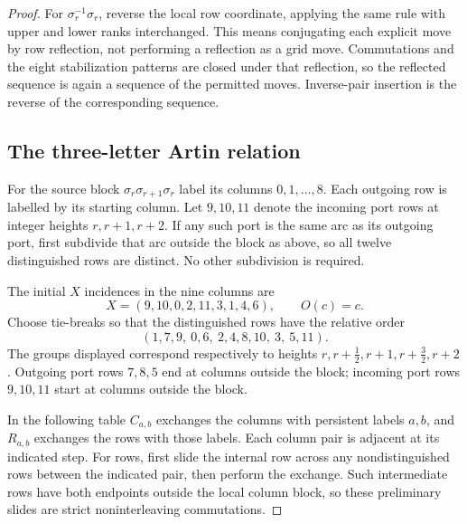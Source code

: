 \documentclass[11pt,a4paper]{article}
\theoremstyle{remark}
\begin{document}
\begin{proof}
For $\sigma_r^{-1}\sigma_r$, reverse the local row coordinate, applying
the same rule with upper and lower ranks interchanged.  This means
conjugating each explicit move by row reflection, not performing a
reflection as a grid move.  Commutations and the eight stabilization
patterns are closed under that reflection, so the reflected sequence is
again a sequence of the permitted moves.  Inverse-pair insertion is the
reverse of the corresponding sequence.

\subsection{The three-letter Artin relation}

For the source block $\sigma_r\sigma_{r+1}\sigma_r$ label its columns
$0,1,\ldots,8$.  Each outgoing row is labelled by its starting column.
Let $9,10,11$ denote the incoming port rows at integer heights
$r,r+1,r+2$.  If any such port is the same arc as its outgoing port,
first subdivide that arc outside the block as above, so all twelve
distinguished rows are distinct.  No other subdivision is required.

The initial $X$ incidences in the nine columns are
\[
 X=(9,10,0,2,11,3,1,4,6),\qquad O(c)=c.
\]
Choose tie-breaks so that the distinguished rows have the relative order
\[
 (1,7,9,\ 0,6,\ 2,4,8,10,\ 3,\ 5,11).
\]
The groups displayed correspond respectively to heights
$r,r+\tfrac12,r+1,r+\tfrac32,r+2$.  Outgoing port rows $7,8,5$ end at
columns outside the block; incoming port rows $9,10,11$ start at
columns outside the block.

In the following table $C_{a,b}$ exchanges the columns with persistent
labels $a,b$, and $R_{a,b}$ exchanges the rows with those labels.  Each
column pair is adjacent at its indicated step.  For rows, first slide
the internal row across any nondistinguished rows between the indicated
pair, then perform the exchange.  Such intermediate rows have both
endpoints outside the local column block, so these preliminary slides
are strict noninterleaving commutations.


\end{proof}
\end{document}
